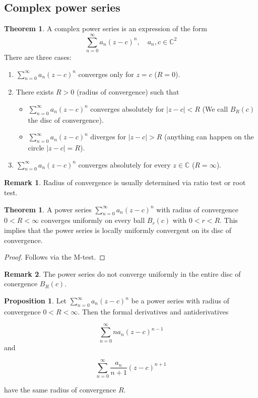 \documentclass[12pt,a4paper]{article}
\theoremstyle{definition}
\newtheorem{theorem}[definition]{Theorem}
\newtheorem{proposition}[definition]{Proposition}
\newtheorem*{remark}{Remark}
\begin{document}
\subsection{Complex power series}

\begin{theorem}
	A complex power series is an expression of the form
	\[
		\sum_{n = 0}^{\infty} a_n {(z - c)}^n, \quad a_n, c \in \mathbb{C}^2
	\]
	There are three cases:

	\begin{enumerate}
		\item $\sum_{n = 0}^{\infty} a_n {(z - c)}^n$ converges only for $z = c$ ($R = 0$).
		\item There exists $R > 0$ (radius of convergence) such that
		\begin{itemize}
			\item $\sum_{n = 0}^{\infty} a_n {(z - c)}^n$ converges absolutely for $|z - c| < R$ (We call $B_R(c)$ the disc of convergence).
			\item $\sum_{n = 0}^{\infty} a_n {(z - c)}^n$ diverges for $|z - c| > R$ (anything can happen on the circle $|z - c| = R$).
		\end{itemize}
		\item $\sum_{n = 0}^{\infty} a_n {(z - c)}^n$ converges absolutely for every $z \in \mathbb{C}$ ($R = \infty$).
	\end{enumerate}
\end{theorem}

\begin{remark}
	Radius of convergence is usually determined via ratio test or root test.
\end{remark}

\begin{theorem}
	A power series $\sum_{n = 0}^{\infty} a_n {(z - c)}^n$ with radius of convergence $0 < R < \infty$ converges uniformly on every ball $B_r(c)$ with $0 < r < R$. This implies that the power series is locally uniformly convergent on its disc of convergence.
\end{theorem}

\begin{proof}
	Follows via the M-test.
\end{proof}

\begin{remark}
	The power series do not converge uniformly in the entire disc of conergence $B_R(c)$.
\end{remark}

\begin{proposition}
	Let $\sum_{n = 0}^{\infty} a_n {(z - c)}^n$ be a power series with radius of convergence $0 < R < \infty$. Then the formal derivatives and antiderivatives

	\[\sum_{n = 0}^{\infty} n a_n {(z - c)}^{n - 1}\] and

	\[\sum_{n = 0}^{\infty} \frac{a_n}{n + 1} {(z - c)}^{n + 1}\]

	have the same radius of convergence $R$.
\end{proposition}
\end{document}

